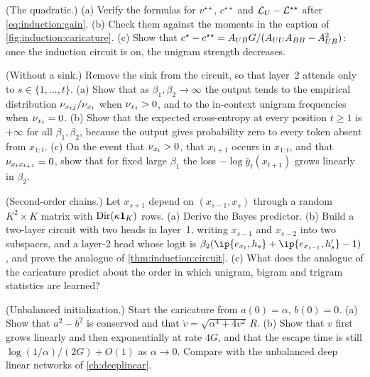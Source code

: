 \begin{refsection}
\begin{exercises}
\item \consolidation (The quadratic.) (a) Verify the formulas for $v^{\star\star}$, $c^{\star\star}$ and $\mathcal{L}_{U}-\mathcal{L}^{\star\star}$ after \eqref{eq:induction:gain}. (b) Check them against the moments in the caption of \cref{fig:induction:caricature}. (c) Show that $c^\star-c^{\star\star}=A_{UB} G/(A_{UU}A_{BB}-A_{UB}^2)$: once the induction circuit is on, the unigram strength decreases. \label{ex:induction:quadratic}

\item \consolidation (Without a sink.) Remove the sink from the circuit, so that layer~2 attends only to $s\in\{1,\dots,t\}$. (a) Show that as $\beta_1,\beta_2\to\infty$ the output tends to the empirical distribution $\nu_{x_tj}/\nu_{x_t}$ when $\nu_{x_t}>0$, and to the in-context unigram frequencies when $\nu_{x_t}=0$. (b) Show that the expected cross-entropy at every position $t\ge1$ is $+\infty$ for all $\beta_1,\beta_2$, because the output gives probability zero to every token absent from $x_{1:t}$. (c) On the event that $\nu_{x_t}>0$, that $x_{t+1}$ occurs in $x_{1:t}$, and that $\nu_{x_tx_{t+1}}=0$, show that for fixed large $\beta_1$ the loss $-\log\hat y_t(x_{t+1})$ grows linearly in $\beta_2$. \label{ex:induction:nosink}

\item \variation (Second-order chains.) Let $x_{s+1}$ depend on $(x_{s-1},x_s)$ through a random $K^2\times K$ matrix with $\operatorname{Dir}(\kappa\mathbf1_K)$ rows. (a) Derive the Bayes predictor. (b) Build a two-layer circuit with two heads in layer~1, writing $x_{s-1}$ and $x_{s-2}$ into two subspaces, and a layer-2 head whose logit is $\beta_2(\ip{e_{x_t},h_s}+\ip{e_{x_{t-1}},h'_s}-1)$, and prove the analogue of \cref{thm:induction:circuit}. (c) What does the analogue of the caricature predict about the order in which unigram, bigram and trigram statistics are learned? \label{ex:induction:trigram}

\item \variation (Unbalanced initialization.) Start the caricature from $a(0)=\alpha$, $b(0)=0$. (a) Show that $a^2-b^2$ is conserved and that $\dot v=\sqrt{\alpha^4+4v^2}\,R$. (b) Show that $v$ first grows linearly and then exponentially at rate $4G$, and that the escape time is still $\log(1/\alpha)/(2G)+O(1)$ as $\alpha\to0$. Compare with the unbalanced deep linear networks of \cref{ch:deeplinear}. \label{ex:induction:unbalanced}


\end{exercises}
\end{refsection}
